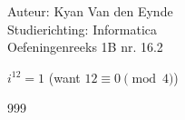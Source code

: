 \documentclass[a4paper]{article}
\begin{document}
  
\noindent \large Auteur: Kyan Van den Eynde \\
\noindent \large Studierichting: Informatica\\
\noindent \large Oefeningenreeks 1B nr. 16.2\\

\medskip

\normalsize

$i^{12} = 1 $ (want $12 \equiv 0 \pmod 4$)\\

\begin{thebibliography}{999}
\end{thebibliography}
\end{document}

